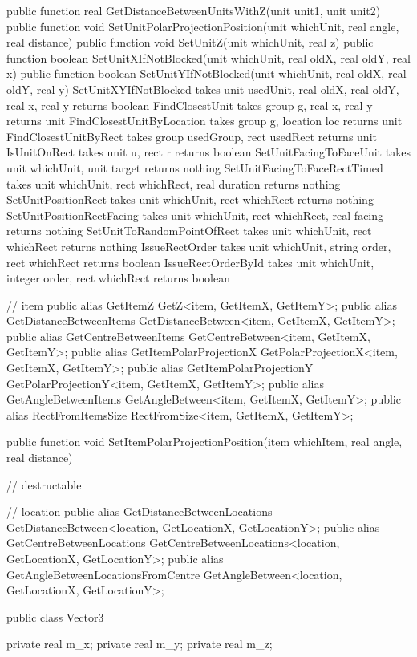 {{		public function real GetDistanceBetweenUnitsWithZ(unit unit1, unit unit2)
		public function void SetUnitPolarProjectionPosition(unit whichUnit, real angle, real distance)
		public function void SetUnitZ(unit whichUnit, real z)
		public function boolean SetUnitXIfNotBlocked(unit whichUnit, real oldX, real oldY, real x)
		public function boolean SetUnitYIfNotBlocked(unit whichUnit, real oldX, real oldY, real y)
		SetUnitXYIfNotBlocked takes unit usedUnit, real oldX, real oldY, real x, real y returns boolean
		FindClosestUnit takes group g, real x, real y returns unit
		FindClosestUnitByLocation takes group g, location loc returns unit
		FindClosestUnitByRect takes group usedGroup, rect usedRect returns unit
		IsUnitOnRect takes unit u, rect r returns boolean
		SetUnitFacingToFaceUnit takes unit whichUnit, unit target returns nothing
		SetUnitFacingToFaceRectTimed takes unit whichUnit, rect whichRect, real duration returns nothing
		SetUnitPositionRect takes unit whichUnit, rect whichRect returns nothing
		SetUnitPositionRectFacing takes unit whichUnit, rect whichRect, real facing returns nothing
		SetUnitToRandomPointOfRect takes unit whichUnit, rect whichRect returns nothing
		IssueRectOrder takes unit whichUnit, string order, rect whichRect returns boolean
		IssueRectOrderById takes unit whichUnit, integer order, rect whichRect returns boolean

		// item
		public alias GetItemZ GetZ<item, GetItemX, GetItemY>;
		public alias GetDistanceBetweenItems GetDistanceBetween<item, GetItemX, GetItemY>;
		public alias GetCentreBetweenItems GetCentreBetween<item, GetItemX, GetItemY>;
		public alias GetItemPolarProjectionX GetPolarProjectionX<item, GetItemX, GetItemY>;
		public alias GetItemPolarProjectionY GetPolarProjectionY<item, GetItemX, GetItemY>;
		public alias GetAngleBetweenItems GetAngleBetween<item, GetItemX, GetItemY>;
		public alias RectFromItemsSize RectFromSize<item, GetItemX, GetItemY>;

		public function void SetItemPolarProjectionPosition(item whichItem, real angle, real distance)

		// destructable
		

		// location
		public alias GetDistanceBetweenLocations GetDistanceBetween<location, GetLocationX, GetLocationY>;
		public alias GetCentreBetweenLocations GetCentreBetweenLocations<location, GetLocationX, GetLocationY>;
		public alias GetAngleBetweenLocationsFromCentre GetAngleBetween<location, GetLocationX, GetLocationY>;

		public class Vector3
		{
			private real m_x;
			private real m_y;
			private real m_z;

}}}
